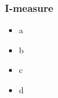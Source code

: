 \documentclass{beamer}
\begin{document}
\begin{frame}
    \frametitle{I-measure}
    \begin{itemize}[<+->]
        \item<+-|alert@+-> a
        \item              b
        \item<+-|alert@+-> c
        \item              d
    \end{itemize}
\end{frame}
\end{document}
